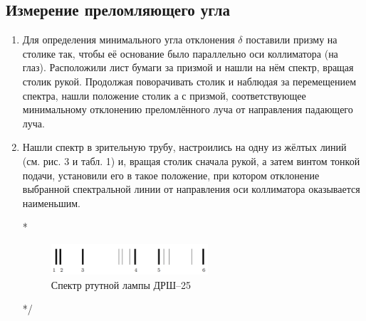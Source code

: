 	\subsection{Измерение преломляющего угла}
	\begin{enumerate}
		\item Для определения минимального угла отклонения $\delta$ поставили призму на столике так, чтобы её основание было параллельно оси коллиматора (на глаз). Расположили лист бумаги за призмой и нашли на нём спектр, вращая столик рукой. Продолжая поворачивать столик и наблюдая за перемещением спектра, нашли положение столик а с призмой, соответствующее минимальному отклонению преломлённого луча от направления падающего луча.
		
		\item Нашли спектр в зрительную трубу, настроились на одну из жёлтых линий (см. рис. 3 и табл. 1) и, вращая столик сначала рукой, а затем винтом тонкой подачи, установили его в такое положение, при котором отклонение выбранной спектральной линии от направления оси коллиматора оказывается наименьшим.		
		
\/*		
	\begin{figure}[h]
			\begin{center}
				\includegraphics[width = 0.55\textwidth]{443-3.png}
				\caption{Спектр ртутной лампы ДРШ--25}
			\end{center}
		\end{figure}
*/
	

\end{enumerate}
